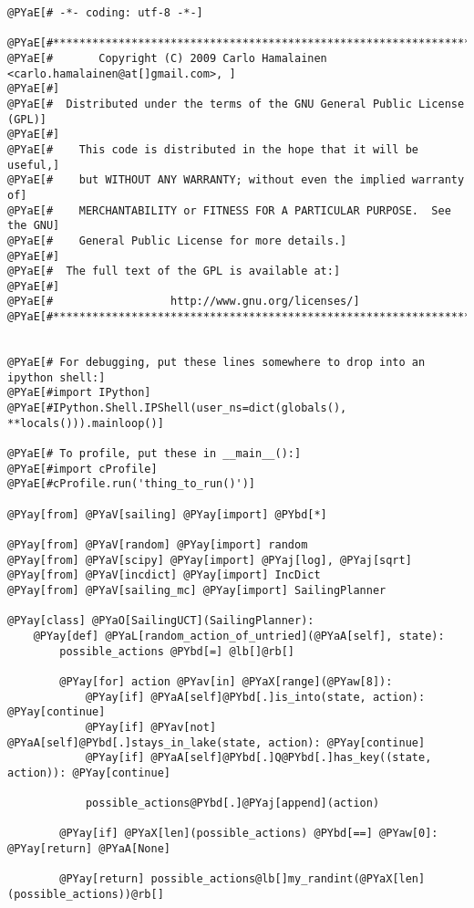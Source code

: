 \begin{Verbatim}[commandchars=@\[\]]
@PYaE[# -*- coding: utf-8 -*-]

@PYaE[#*****************************************************************************]
@PYaE[#       Copyright (C) 2009 Carlo Hamalainen <carlo.hamalainen@at[]gmail.com>, ]
@PYaE[#]
@PYaE[#  Distributed under the terms of the GNU General Public License (GPL)]
@PYaE[#]
@PYaE[#    This code is distributed in the hope that it will be useful,]
@PYaE[#    but WITHOUT ANY WARRANTY; without even the implied warranty of]
@PYaE[#    MERCHANTABILITY or FITNESS FOR A PARTICULAR PURPOSE.  See the GNU]
@PYaE[#    General Public License for more details.]
@PYaE[#]
@PYaE[#  The full text of the GPL is available at:]
@PYaE[#]
@PYaE[#                  http://www.gnu.org/licenses/]
@PYaE[#*****************************************************************************]


@PYaE[# For debugging, put these lines somewhere to drop into an ipython shell:]
@PYaE[#import IPython]
@PYaE[#IPython.Shell.IPShell(user_ns=dict(globals(), **locals())).mainloop()]

@PYaE[# To profile, put these in __main__():]
@PYaE[#import cProfile]
@PYaE[#cProfile.run('thing_to_run()')]

@PYay[from] @PYaV[sailing] @PYay[import] @PYbd[*]

@PYay[from] @PYaV[random] @PYay[import] random
@PYay[from] @PYaV[scipy] @PYay[import] @PYaj[log], @PYaj[sqrt]
@PYay[from] @PYaV[incdict] @PYay[import] IncDict
@PYay[from] @PYaV[sailing_mc] @PYay[import] SailingPlanner

@PYay[class] @PYaO[SailingUCT](SailingPlanner):
    @PYay[def] @PYaL[random_action_of_untried](@PYaA[self], state):
        possible_actions @PYbd[=] @lb[]@rb[]

        @PYay[for] action @PYav[in] @PYaX[range](@PYaw[8]):
            @PYay[if] @PYaA[self]@PYbd[.]is_into(state, action): @PYay[continue]
            @PYay[if] @PYav[not] @PYaA[self]@PYbd[.]stays_in_lake(state, action): @PYay[continue]
            @PYay[if] @PYaA[self]@PYbd[.]Q@PYbd[.]has_key((state, action)): @PYay[continue]

            possible_actions@PYbd[.]@PYaj[append](action)

        @PYay[if] @PYaX[len](possible_actions) @PYbd[==] @PYaw[0]: @PYay[return] @PYaA[None]

        @PYay[return] possible_actions@lb[]my_randint(@PYaX[len](possible_actions))@rb[]


\end{Verbatim}
